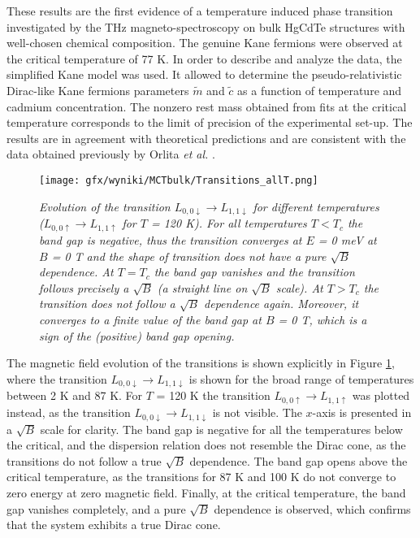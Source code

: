 \documentclass[titlepage,a4paper]{book}
\begin{document}
These results are the first evidence of a temperature induced phase transition investigated by the THz magneto-spectroscopy on bulk HgCdTe structures with well-chosen chemical composition. The genuine Kane fermions were observed at the critical temperature of 77 K. In order to describe and analyze the data, the simplified Kane model was used. It allowed to determine the pseudo-relativistic Dirac-like Kane fermions parameters $\tilde{m}$ and $\tilde{c}$ as a function of temperature and cadmium concentration. The nonzero rest mass obtained from fits at the critical temperature corresponds to the limit of precision of the experimental set-up. The results are in agreement with theoretical predictions and are consistent with the data obtained previously by Orlita \textit{et al.} \cite{Orlita_MCT}.

\begin{figure}[ht]
	\centering
	\texttt{[image: gfx/wyniki/MCTbulk/Transitions\_allT.png]}
	\vspace{-10pt}
	\caption{\textit{Evolution of the transition $L_{0,0\downarrow} \rightarrow L_{1,1\downarrow}$ for different temperatures ($L_{0,0\uparrow} \rightarrow L_{1,1\uparrow}$ for $T$ = 120 K). For all temperatures $T < T_c$ the band gap is negative, thus the transition converges at $E$ = 0 meV at $B$ = 0 T and the shape of transition does not have a pure $\sqrt{B}$ dependence. At $T = T_c$ the band gap vanishes and the transition follows precisely a $\sqrt{B}$ (a straight line on $\sqrt{B}$ scale). At $T > T_c$ the transition does not follow a $\sqrt{B}$ dependence again. Moreover, it converges to a finite value of the band gap at $B$ = 0 T, which is a sign of the (positive) band gap opening.}}
	\label{fig:Bulk_Transitions_allT}
\end{figure}
The magnetic field evolution of the transitions is shown explicitly in Figure \ref{fig:Bulk_Transitions_allT}, where the transition $L_{0,0\downarrow} \rightarrow L_{1,1\downarrow}$ is shown for the broad range of temperatures between 2 K and 87 K. For $T$ = 120 K the transition $L_{0,0\uparrow} \rightarrow L_{1,1\uparrow}$ was plotted instead, as the transition $L_{0,0\downarrow} \rightarrow L_{1,1\downarrow}$ is not visible. The $x$-axis is presented in a $\sqrt{B}$ scale for clarity. The band gap is negative for all the temperatures below the critical, and the dispersion relation does not resemble the Dirac cone, as the transitions do not follow a true $\sqrt{B}$ dependence. The band gap opens above the critical temperature, as the transitions for 87 K and 100 K do not converge to zero energy at zero magnetic field. Finally, at the critical temperature, the band gap vanishes completely, and a pure $\sqrt{B}$ dependence is observed, which confirms that the system exhibits a true Dirac cone.
\end{document}

